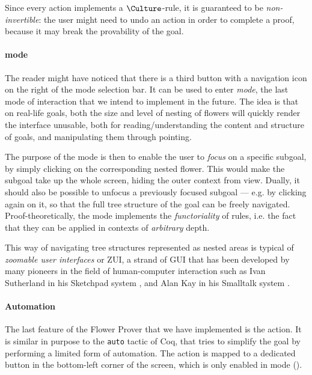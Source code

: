 Since every \Edit action implements a $\Culture$-rule, it is guaranteed to be
\emph{non-invertible}: the user might need to undo an \Edit action in order to
complete a proof, because it may break the provability of the goal.

\paragraph{\Navigation mode}

The reader might have noticed that there is a third button with a navigation
icon on the right of the mode selection bar. It can be used to enter
\emph{\Navigation mode}, the last mode of interaction that we intend to implement
in the future. The idea is that on real-life goals, both the size and level of
nesting of flowers will quickly render the interface unusable, both for
reading/understanding the content and structure of goals, and manipulating them
through pointing.

The purpose of the \Navigation mode is then to enable the user to \emph{focus} on
a specific subgoal, by simply clicking on the corresponding nested flower. This
would make the subgoal take up the whole screen, hiding the outer context from
view. Dually, it should also be possible to unfocus a previously focused subgoal
--- e.g. by clicking again on it, so that the full tree structure of the goal
can be freely navigated. Proof-theoretically, the \Navigation mode implements the
\emph{functoriality} of rules, i.e. the fact that they can be applied in
contexts of \emph{arbitrary} depth.

\begin{remark}
This way of navigating tree structures represented as nested areas is typical of
\emph{zoomable user interfaces} or ZUI, a strand of GUI that has been developed
by many pioneers in the field of human-computer interaction such as Ivan
Sutherland in his Sketchpad system , and Alan
Kay in his Smalltalk system .
\end{remark}

\paragraph{Automation}

The last feature of the Flower Prover that we have implemented is the
 \Proof action. It is similar in purpose to the \texttt{auto}
tactic of Coq, that tries to simplify the goal by performing a limited form of
automation. The  action is mapped to a dedicated button in the
bottom-left corner of the screen, which is only enabled in \Proof mode
().

